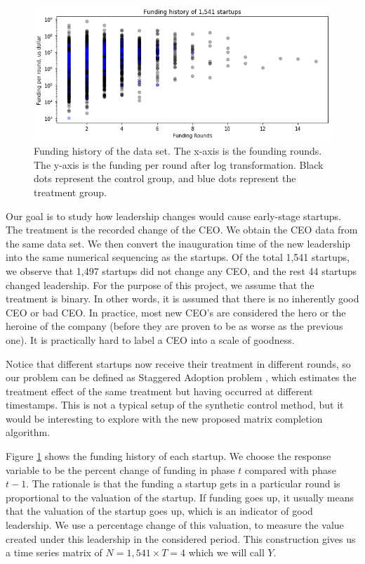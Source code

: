 \documentclass[12pt]{article}
\begin{document}
\begin{figure}
    \centering
    \includegraphics[width=\textwidth]{figures/history.png}
    \caption{Funding history of the data set. The x-axis is the founding rounds. The y-axis is the funding per round after log transformation. Black dots represent the control group, and blue dots represent the treatment group. }
    \label{fig:history}
\end{figure}

Our goal is to study how leadership changes would cause early-stage startups. The treatment is the recorded change of the CEO. We obtain the CEO data from the same data set. We then convert the inauguration time of the new leadership into the same numerical sequencing as the startups. Of the total  1,541 startups, we observe that 1,497 startups did not change any CEO, and the rest 44 startups changed leadership. For the purpose of this project, we assume that the treatment is binary. In other words, it is assumed that there is no inherently good CEO or bad CEO. In practice, most new CEO's are considered the hero or the heroine of the company (before they are proven to be as worse as the previous one). It is practically hard to label a CEO into a scale of goodness.

Notice that different startups now receive their treatment in different rounds, so our problem can be defined as Staggered Adoption problem \cite{athey2022design}, which estimates the treatment effect of the same treatment but having occurred at different timestamps. This is not a typical setup of the synthetic control method, but it would be interesting to explore with the new proposed matrix completion algorithm.

Figure \ref{fig:history} shows the funding history of each startup. We choose the response variable to be the percent change of funding in phase $t$ compared with phase $t-1$. The rationale is that the funding a startup gets in a particular round is proportional to the valuation of the startup. If funding goes up, it usually means that the valuation of the startup goes up, which is an indicator of good leadership. We use a percentage change of this valuation, to measure the value created under this leadership in the considered period. This construction gives us a time series matrix of $N=1,541 \times T=4$ which we will call $Y$.
\end{document}

